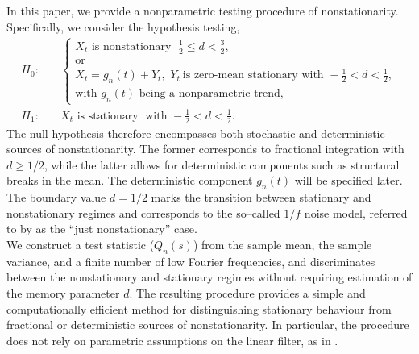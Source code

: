 \documentclass[12pt]{article}
\numberwithin{equation}{section}
\begin{document}
In this paper, we provide a nonparametric testing procedure of nonstationarity.
 Specifically, we consider the hypothesis testing, 
\[
\begin{aligned}
H_0:\quad &
\left\{
\begin{array}{l}
X_t\textrm{ is nonstationary } \; \tfrac12 \le d < \tfrac32, \\
\text{or} \\
X_t=g_n(t)+Y_t,\,\, Y_t\ \textrm{is zero-mean stationary with } -\tfrac12 < d < \tfrac12,\\
\textrm{with }g_n(t)\textrm{ being a nonparametric trend,}
\end{array}
\right.
\\[1em]
H_1:\quad & X_t\textrm{ is stationary }\;\textrm{with } -\tfrac12 < d < \tfrac12.
\end{aligned}
\]
The null hypothesis therefore encompasses both stochastic and deterministic sources of nonstationarity. The former corresponds to fractional integration with $d\ge 1/2$, while the latter allows for deterministic components such as structural breaks in the mean. The deterministic component $g_n(t)$ will be specified later.\\
The boundary value $d=1/2$ marks the transition between stationary and nonstationary regimes and corresponds to the so--called $1/f$ noise model, referred to by \cite{Robinson} as the ``just nonstationary'' case.\\
We construct a test statistic ($Q_n(s)$) from the sample mean, the sample variance, and a finite number of low Fourier frequencies, and discriminates between the nonstationary and stationary regimes without requiring estimation of the memory parameter $d$. The resulting procedure provides a simple and computationally efficient method for distinguishing stationary behaviour from fractional or deterministic sources of nonstationarity. In particular, the procedure does not rely on parametric assumptions on the linear filter, as in \cite{Robinson}. 
\end{document}
